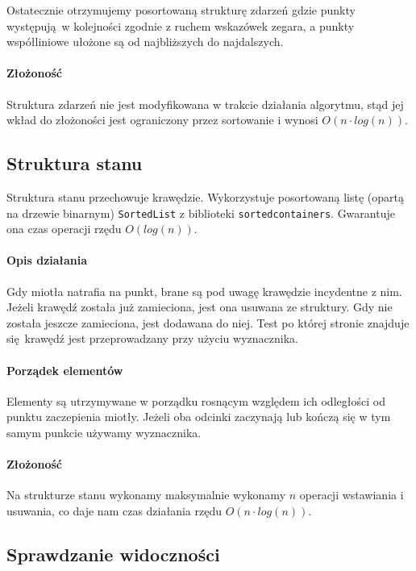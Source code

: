 \documentclass[12pt]{article}
\begin{document}
			\vspace{\baselineskip} %
			Ostatecznie otrzymujemy posortowaną strukturę zdarzeń gdzie punkty występują w kolejności zgodnie z ruchem wskazówek zegara, a punkty współliniowe ułożone są od najbliższych do najdalszych.
			
			\paragraph{Złożoność}
				Struktura zdarzeń nie jest modyfikowana w trakcie działania algorytmu, stąd jej wkład do złożoności jest ograniczony przez sortowanie i wynosi $ O(n \cdot log(n)) $.
		
		\subsection{Struktura stanu}
			Struktura stanu przechowuje krawędzie. Wykorzystuje posortowaną listę (opartą na drzewie binarnym) \lstinline|SortedList| z biblioteki \lstinline|sortedcontainers|. Gwarantuje ona czas operacji rzędu $ O(log(n)) $.
			
			\paragraph{Opis działania}
				Gdy miotła natrafia na punkt, brane są pod uwagę krawędzie incydentne z nim. Jeżeli krawędź została już zamieciona, jest ona usuwana ze struktury. Gdy nie została jeszcze zamieciona, jest dodawana do niej. Test po której stronie znajduje się krawędź jest przeprowadzany przy użyciu wyznacznika.
				
			\paragraph{Porządek elementów}
				Elementy są utrzymywane w porządku rosnącym względem ich odległości od punktu zaczepienia miotły. Jeżeli oba odcinki zaczynają lub kończą się w tym samym punkcie używamy wyznacznika.
				
			\paragraph{Złożoność}
				Na strukturze stanu wykonamy maksymalnie wykonamy $ n $ operacji wstawiania i usuwania, co daje nam czas działania rzędu $ O(n \cdot log(n)) $.
		
		\pagebreak
		\subsection{Sprawdzanie widoczności}
			
\end{document}
